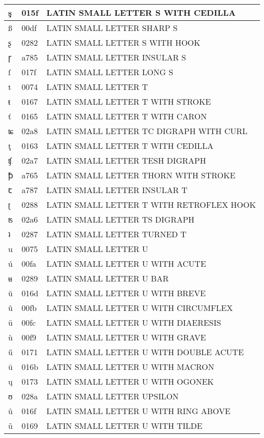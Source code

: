 \documentclass[12pt,letterpaper,openany]{book}
\begin{document}
\begin{center}
\begin{supertabular}{|m{0.25in}|m{0.5in}|m{4in}|}
ş & 015f & LATIN SMALL LETTER S WITH CEDILLA\\\hline
ß & 00df & LATIN SMALL LETTER SHARP S\\\hline
ʂ & 0282 & LATIN SMALL LETTER S WITH HOOK\\\hline
ꞅ & a785 & LATIN SMALL LETTER INSULAR S\\\hline
ſ & 017f & LATIN SMALL LETTER LONG S\\\hline
t & 0074 & LATIN SMALL LETTER T\\\hline
ŧ & 0167 & LATIN SMALL LETTER T WITH STROKE\\\hline
ť & 0165 & LATIN SMALL LETTER T WITH CARON\\\hline
ʨ & 02a8 & LATIN SMALL LETTER TC DIGRAPH WITH CURL\\\hline
ţ & 0163 & LATIN SMALL LETTER T WITH CEDILLA\\\hline
ʧ & 02a7 & LATIN SMALL LETTER TESH DIGRAPH\\\hline
ꝥ & a765 & LATIN SMALL LETTER THORN WITH STROKE\\\hline
ꞇ & a787 & LATIN SMALL LETTER INSULAR T\\\hline
ʈ & 0288 & LATIN SMALL LETTER T WITH RETROFLEX HOOK\\\hline
ʦ & 02a6 & LATIN SMALL LETTER TS DIGRAPH\\\hline
ʇ & 0287 & LATIN SMALL LETTER TURNED T\\\hline
u & 0075 & LATIN SMALL LETTER U\\\hline
ú & 00fa & LATIN SMALL LETTER U WITH ACUTE\\\hline
ʉ & 0289 & LATIN SMALL LETTER U BAR\\\hline
ŭ & 016d & LATIN SMALL LETTER U WITH BREVE\\\hline
û & 00fb & LATIN SMALL LETTER U WITH CIRCUMFLEX\\\hline
ü & 00fc & LATIN SMALL LETTER U WITH DIAERESIS\\\hline
ù & 00f9 & LATIN SMALL LETTER U WITH GRAVE\\\hline
ű & 0171 & LATIN SMALL LETTER U WITH DOUBLE ACUTE\\\hline
ū & 016b & LATIN SMALL LETTER U WITH MACRON\\\hline
ų & 0173 & LATIN SMALL LETTER U WITH OGONEK\\\hline
ʊ & 028a & LATIN SMALL LETTER UPSILON\\\hline
ů & 016f & LATIN SMALL LETTER U WITH RING ABOVE\\\hline
ũ & 0169 & LATIN SMALL LETTER U WITH TILDE\\\hline

\end{supertabular}
\end{center}
\end{document}

